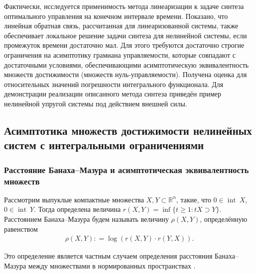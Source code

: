 \documentclass[../main.tex]{subfiles}
\begin{document}
Фактически, исследуется применимость метода линеаризации к задаче синтеза оптимального управления на конечном интервале времени. 
Показано, что линейная обратная связь, рассчитанная для линеаризованной системы, также обеспечивает локальное решение задачи синтеза для нелинейной системы, если промежуток времени достаточно мал. 
Для этого требуются достаточно строгие ограничения на асимптотику грамиана управляемости, которые совпадают с достаточными условиями, обеспечивающими асимптотическую эквивалентность множеств достижимости (множеств нуль-управляемости). 
Получена оценка для относительных значений погрешности интегрального функционала. 
Для демонстрации реализации описанного метода синтеза приведён пример нелинейной упругой системы под действием внешней силы. 


\subsection{Асимптотика множеств достижимости нелинейных систем с интегральными ограничениями} 


\subsubsection{Расстояние Банаха--Мазура и асимптотическая эквивалентность множеств}\label{sec21:AsymptoticEquality}

Рассмотрим выпуклые компактные множества $ X,Y \subset \mathbb R^n $, такие, что $0 \in \operatorname{int}\ X$, \mbox{$0 \in \operatorname{int}\ Y$}. 
Тогда определена величина $r(X, Y) = \inf \{t \geqslant 1: tX \supset Y \}$. 
Расстоянием \mbox{Банаха--Мазура} будем называть величину $ \rho (X, Y) $, определённую равенством 
\begin{gather*}
 \rho (X, Y): = \log (r(X,Y) \cdot r(Y, X)).
\end{gather*}

Это определение является частным случаем определения расстояния Банаха--Мазура между  множествами в нормированных пространствах \cite[Определение 2.4.6]{Thompson}.
\end{document}
